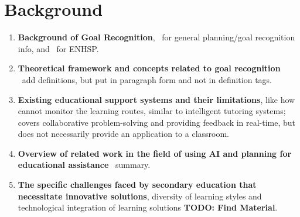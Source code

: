 \section{Background}
\begin{enumerate}
    \item \textbf{Background of Goal Recognition},~\citet{meneguzzi2021survey} for general planning/goal recognition info, and~\citet{Scala2016,ScalaHaslum2016} for ENHSP.
    \item \textbf{Theoretical framework and concepts related to goal recognition} \textemdash~add definitions, but put in paragraph form and not in definition tags.
    \item \textbf{Existing educational support systems and their limitations}, like how~\citet{Garrido2009} cannot monitor the learning routes, similar to intelligent tutoring systems;~\citet{Rojas2022} covers collaborative problem-solving and providing feedback in real-time, but does not necessarily provide an application to a classroom.
    \item \textbf{Overview of related work in the field of using AI and planning for educational assistance}~\cite{Castillo2009} summary.
    \item \textbf{The specific challenges faced by secondary education that necessitate innovative solutions}, diversity of learning styles and technological integration of learning solutions \textbf{TODO: Find Material}.
\end{enumerate}
